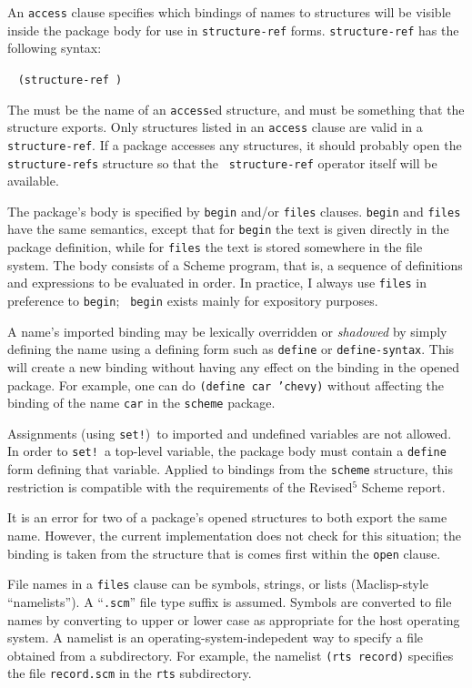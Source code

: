 An {\tt access} clause specifies which bindings of names to structures
will be visible inside the package body for use in {\tt structure-ref}
forms.  {\tt structure-ref} has the following syntax:
\begin{tabbing}
\qquad {} \goesto{}~
   \tt(structure-ref  )
\end{tabbing}
The  must be the name of an {\tt access}ed structure,
and  must be something that the structure exports.  Only
structures listed in an {\tt access} clause are valid in a {\tt
structure-ref}.  If a package accesses any structures, it should
probably open the {\tt structure-refs} structure so that the {\tt
structure-ref} operator itself will be available.

The package's body is specified by {\tt begin} and/or {\tt files}
clauses.  {\tt begin} and {\tt files} have the same semantics, except
that for {\tt begin} the text is given directly in the package
definition, while for {\tt files} the text is stored somewhere in the
file system.  The body consists of a Scheme program, that is, a
sequence of definitions and expressions to be evaluated in order.  In
practice, I always use {\tt files} in preference to {\tt begin}; {\tt
begin} exists mainly for expository purposes.

A name's imported binding may be lexically overridden or {\em shadowed}
by simply defining the name using a defining form such as {\tt define}
or {\tt define-syntax}.  This will create a new binding without having
any effect on the binding in the opened package.  For example, one can
do {\tt(define car 'chevy)} without affecting the binding of the name
{\tt car} in the {\tt scheme} package.

Assignments (using {\tt set!})\ to imported and undefined variables
are not allowed.  In order to {\tt set!}\ a top-level variable, the
package body must contain a {\tt define} form defining that variable.
Applied to bindings from the {\tt scheme} structure, this restriction
is compatible with the requirements of the Revised$^5$ Scheme report.

It is an error for two of a package's opened structures to both export
the same name.  However, the current implementation does not check for
this situation; the binding is taken from the structure that is comes
first within the {\tt open} clause.

File names in a {\tt files} clause can be symbols, strings, or lists
(Maclisp-style ``namelists'').  A ``{\tt.scm}'' file type suffix is
assumed.  Symbols are converted to file names by converting to upper
or lower case as appropriate for the host operating system.  A
namelist is an operating-system-indepedent way to specify a file
obtained from a subdirectory.  For example, the namelist {\tt(rts
record)} specifies the file {\tt record.scm} in the {\tt rts}
subdirectory.

